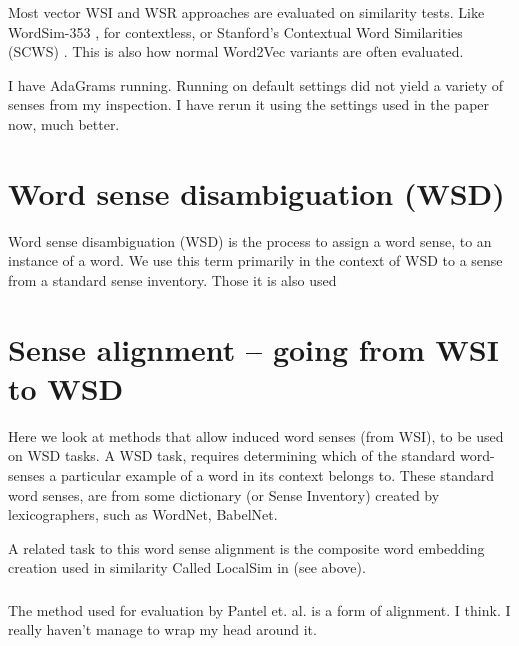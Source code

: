 \documentclass[12pt,parskip]{komatufte}
\begin{document}
Most vector WSI and WSR approaches are evaluated on similarity tests.
Like WordSim-353 \cite{WordSim353}, for contextless, or Stanford's Contextual Word Similarities (SCWS) \cite{Huang2012}. This is also how normal Word2Vec variants are often evaluated.







I have AdaGrams running. Running on default settings did not yield a variety of senses from my inspection. I have rerun it using the settings used in the paper now, much better.



\section{Word sense disambiguation (WSD)}
Word sense disambiguation (WSD) is the process to assign a word sense, to an instance of a word. We use this term primarily in the context of WSD to a sense from a standard sense inventory. Those it is also used 



\section{Sense alignment -- going from WSI to WSD}
Here we look at methods that allow induced word senses (from WSI), to be used on WSD tasks.
A WSD task, requires determining which of the standard word-senses a particular example of a word in its context belongs to.
These standard word senses, are from some dictionary (or Sense Inventory) created by 
lexicographers, such as WordNet, BabelNet.

A related task to this word sense alignment is the composite word embedding creation used in similarity Called LocalSim in \textcite{Huang2012} (see above).



\subsubsection{\textcite {pantel2002WSI}}
The method used for evaluation by Pantel et. al. is a form of alignment. I think.
I really haven't manage to wrap my head around it.
\end{document}
